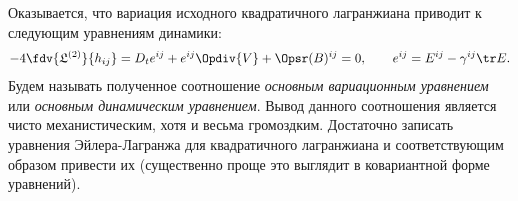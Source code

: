 \documentclass[\docroot/reports/draft/report.tex]{subfiles}
\begin{document}
    Оказывается, что вариация исходного квадратичного лагранжиана приводит к следующим уравнениям динамики:
    \begin{equation}\begin{aligned}\label{eq:lagr2var}
        -4\fdv{\mathfrak{L}^{(2)}}{h_{ij}} = D_t{e^{ij}} + e^{ij} \Opdiv{V} + \Opsr(B)^{ij} = 0, \qquad e^{ij} = E^{ij} - \gamma^{ij} \tr E .
    \end{aligned}\end{equation}
    Будем называть полученное соотношение \textit{основным вариационным уравнением} или \textit{основным динамическим уравнением}. Вывод данного соотношения является чисто механистическим, хотя и весьма громоздким. Достаточно записать уравнения Эйлера-Лагранжа для квадратичного лагранжиана и соответствующим образом привести их (существенно проще это выглядит в ковариантной форме уравнений).
\end{document}
